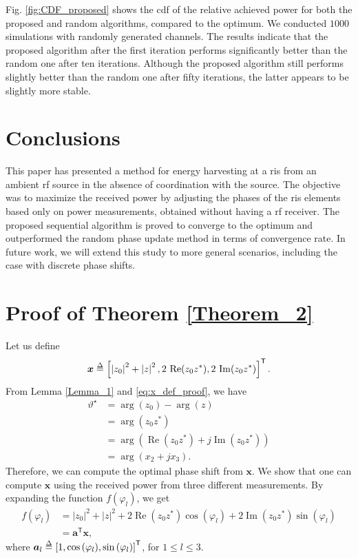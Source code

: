 \documentclass[conference]{IEEEtran}
\begin{document}
Fig. \ref{fig:CDF_proposed} shows the \gls*{cdf} of the relative achieved power for both the proposed and random algorithms, compared to the optimum. We conducted $1000$ simulations with randomly generated channels. The results indicate that the proposed algorithm after the first iteration performs significantly better than the random one after ten iterations. Although the proposed algorithm still performs slightly better than the random one after fifty iterations, the latter appears to be slightly more stable.


\section{Conclusions}\label{sec:Conclusion}
 This paper has presented a method for energy harvesting at a \gls*{ris} from an ambient \gls*{rf} source in the absence of coordination with the source. The objective was to maximize the received power by adjusting the phases of the \gls*{ris} elements based only on power measurements, obtained without having a \gls*{rf} receiver. The proposed sequential algorithm is proved to converge to the optimum and outperformed the random phase update method in terms of convergence rate.
 In future work, we will extend this study to  more general scenarios, including the case with discrete phase shifts.


\appendices
\section{Proof of Theorem \ref{Theorem_2}} \label{App_T2}
Let us define
\begin{equation}\label{eq:x_def_proof}
    \bm{x}\delequal \left[\left|z_{0}\right|^{2}+\left|z\right|^{2}, 2\,\operatorname{Re}\!{\left(z_{0}z^{*}\right)}, 2\,\operatorname{Im}\!{\left(z_{0}z^{*}\right)}\right]^{\mathsf{T}}.
\end{equation}
From Lemma \ref{Lemma_1} and \eqref{eq:x_def_proof}, we have 
\begin{align*}
     \vartheta^{\star}&=\arg{\left(z_{0}\right)}-\arg{\left(z\right)}\\
     &=\arg{\left(z_{0}z^{*}\right)}\\
     &=\arg{\left(\operatorname{Re}\!{\left(z_{0}z^{*}\right)}+j\operatorname{Im}\!{\left(z_{0}z^{*}\right)}\right)}\\
     &=\arg{\left(x_{2}+j x_{3}\right)}.
\end{align*}
Therefore, we can compute the optimal phase shift from $\bm{x}$. We show that one can compute $\bm{x}$ using the received power from three different measurements. By expanding the function $f{\left(\varphi_{l}\right)}$, we get
\begin{align}
    f{\left(\varphi_{l}\right)}&\!=\!\left|z_{0}\right|^{2}\!\!+\! \left|z\right|^{2}\!\!+\!2\operatorname{Re}\left(z_{0}z^{*}\right)\!\cos{\left(\varphi_{l}\right)}\!\!+\!2\operatorname{Im}\left(z_{0}z^{*}\right)\!\sin{\left(\varphi_{l}\right)}\nonumber\\
    &=\bm{a}^\mathsf{T}\bm{x},
\end{align}
where $\bm{a}_{l}\delequal\left[1, \cos{\left(\varphi_{l}\right)},  \sin{\left(\varphi_{l}\right)}\right]^{\mathsf{T}}$, for $1\leq l\leq 3$. 
\end{document}
